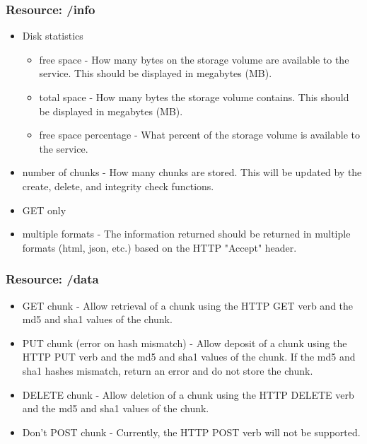 \documentclass[letterpaper]{article}
\begin{document}
\subsubsection{Resource: /info}

\begin{itemize}
\item
Disk statistics
\begin{itemize}
\item
free space - How many bytes on the storage volume are available to the service.  This should be displayed in megabytes
(MB).

\item
total space - How many bytes the storage volume contains.  This should be displayed in megabytes (MB).

\item
free space percentage - What percent of the storage volume is available to the service.
\end{itemize}

\item
number of chunks - How many chunks are stored.  This will be updated by the create, delete, and integrity check
functions.

\item
GET only

\item
multiple formats - The information returned should be returned in multiple formats (html, json, etc.) based on the HTTP
"Accept" header.
\end{itemize}

\subsubsection{Resource: /data}

\begin{itemize}
\item
GET chunk - Allow retrieval of a chunk using the HTTP GET verb and the md5 and sha1 values of the chunk.

\item
PUT chunk (error on hash mismatch) - Allow deposit of a chunk using the HTTP PUT verb and the md5 and sha1 values of the
chunk.  If the md5 and sha1 hashes mismatch, return an error and do not store the chunk.

\item
DELETE chunk - Allow deletion of a chunk using the HTTP DELETE verb and the md5 and sha1 values of the chunk.

\item
Don't POST chunk - Currently, the HTTP POST verb will not be supported.
\end{itemize}
\end{document}
